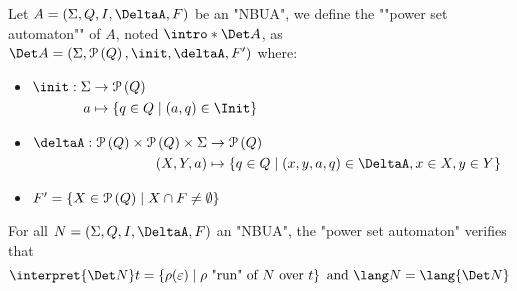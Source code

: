\documentclass[a4paper,UKenglish,cleveref, autoref, thm-restate]{lipics-v2021}
\begin{document}
\begin{definition}
	\AP Let $A = \NBUA$ be an "NBUA", we define the ""power set automaton"" of $A$, noted $\intro* \Det A$, as
	$\Det A = (\Sigma, \parts Q, \init, \deltaA, F')$ where:

	\begin{itemize}
		\item $\begin{aligned}[t]
				      \init      : \Sigma & \to \parts Q                              \\
				      a                   & \mapsto \setdef{q \in Q}{(a,q) \in \Init}
			      \end{aligned} $

		\item $\begin{aligned}[t]
				      \deltaA               : \parts Q \times \parts Q \times \Sigma & \to \parts Q                                                      \\
				      (X, Y, a)                                                      & \mapsto \setdef{q \in Q}{(x,y,a,q) \in \DeltaA, x \in X, y \in Y}
			      \end{aligned}$

		\item $F' = \left\{X \in \mathcal{P}\left(Q\right) \mid X \cap F \neq \emptyset\right\}$
	\end{itemize}
\end{definition}

\begin{theorem}\label{thm:determinisation}
	For all $N = \NBUA$ an "NBUA", the "power set automaton" verifies that
	\[
		\interpret {\Det N} t = \setdef {\rho(\varepsilon)}{\text{$\rho$ "run" of~$N$ over~$t$}} \text{ and } \lang N = \lang {\Det N}
	\]
\end{theorem}
\end{document}
